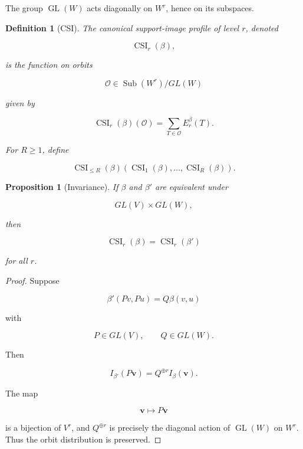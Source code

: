 \documentclass[11pt]{article}
\newtheorem{proposition}[theorem]{Proposition}
\newtheorem{definition}[theorem]{Definition}
\begin{document}
The group $\operatorname{GL}(W)$ acts diagonally on $W^r$, hence on its subspaces.

\begin{definition}[CSI]

The canonical support-image profile of level $r$, denoted

\[
\operatorname{CSI}_r(\beta),
\]

is the function on orbits

\[
\mathcal O\in \operatorname{Sub}(W^r)/GL(W)
\]

given by

\[
\operatorname{CSI}_r(\beta)(\mathcal O)
=\sum_{T\in\mathcal O}E_r^\beta(T).
\]

For $R\ge1$, define

\[
\operatorname{CSI}_{\le R}(\beta)
(\operatorname{CSI}_1(\beta),\dots,\operatorname{CSI}_R(\beta)).
\]

\end{definition}
\begin{proposition}[Invariance]

If $\beta$ and $\beta'$ are equivalent under

\[
GL(V)\times GL(W),
\]

then

\[
\operatorname{CSI}_r(\beta)=\operatorname{CSI}_r(\beta')
\]

for all $r$.

\end{proposition}
\begin{proof}

Suppose

\[
\beta'(Pv,Pu)=Q\beta(v,u)
\]

with

\[
P\in GL(V),
\qquad
Q\in GL(W).
\]

Then

\[
I_{\beta'}(P\mathbf v)
=Q^{\oplus r}I_\beta(\mathbf v).
\]

The map

\[
\mathbf v\mapsto P\mathbf v
\]

is a bijection of $V^r$, and $Q^{\oplus r}$ is precisely the diagonal action of $\operatorname{GL}(W)$ on $W^r$. Thus the orbit distribution is preserved.
\end{proof}
\end{document}
